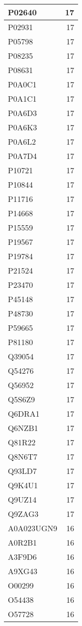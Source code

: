 \documentclass[
]{book}
\theoremstyle{definition}
\theoremstyle{definition}
\theoremstyle{definition}
\theoremstyle{definition}
\theoremstyle{remark}
\begin{document}
\begin{table}
\begin{tabular}{l|r}
\hline
P02640 & 17\\
\hline
P02931 & 17\\
\hline
P05798 & 17\\
\hline
P08235 & 17\\
\hline
P08631 & 17\\
\hline
P0A0C1 & 17\\
\hline
P0A1C1 & 17\\
\hline
P0A6D3 & 17\\
\hline
P0A6K3 & 17\\
\hline
P0A6L2 & 17\\
\hline
P0A7D4 & 17\\
\hline
P10721 & 17\\
\hline
P10844 & 17\\
\hline
P11716 & 17\\
\hline
P14668 & 17\\
\hline
P15559 & 17\\
\hline
P19567 & 17\\
\hline
P19784 & 17\\
\hline
P21524 & 17\\
\hline
P23470 & 17\\
\hline
P45148 & 17\\
\hline
P48730 & 17\\
\hline
P59665 & 17\\
\hline
P81180 & 17\\
\hline
Q39054 & 17\\
\hline
Q54276 & 17\\
\hline
Q56952 & 17\\
\hline
Q5S6Z9 & 17\\
\hline
Q6DRA1 & 17\\
\hline
Q6NZB1 & 17\\
\hline
Q81R22 & 17\\
\hline
Q8N6T7 & 17\\
\hline
Q93LD7 & 17\\
\hline
Q9K4U1 & 17\\
\hline
Q9UZ14 & 17\\
\hline
Q9ZAG3 & 17\\
\hline
A0A023UGN9 & 16\\
\hline
A0R2B1 & 16\\
\hline
A3F9D6 & 16\\
\hline
A9XG43 & 16\\
\hline
O00299 & 16\\
\hline
O54438 & 16\\
\hline
O57728 & 16\\

\end{tabular}
\end{table}
\end{document}

